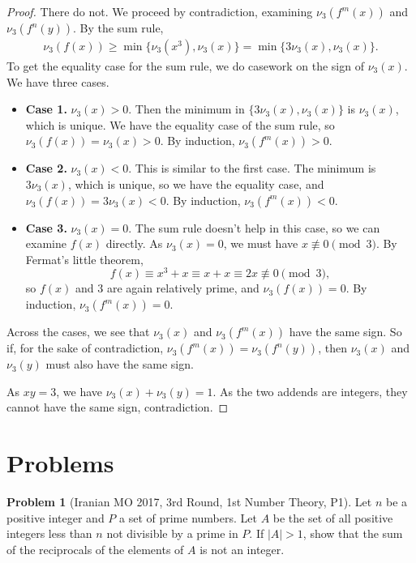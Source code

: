 \documentclass[11pt]{article}
\theoremstyle{definition}
\newtheorem{problem}{Problem}
\begin{document}
\begin{proof}
There do not. We proceed by contradiction, examining $\nu_3(f^m(x))$ and $\nu_3(f^n(y))$. By the sum rule,
\begin{align*}
  \nu_3(f(x))
  \ge \min\{ \nu_3(x^3), \nu_3(x) \}
  = \min\{ 3 \nu_3(x), \nu_3(x) \}.
\end{align*}
To get the equality case for the sum rule, we do casework on the sign of $\nu_3(x)$. We have three cases.

\begin{itemize}

\item \textbf{Case 1.} $\nu_3(x) > 0$. Then the minimum in $\{ 3\nu_3(x), \nu_3(x) \}$ is $\nu_3(x)$, which is unique. We have the equality case of the sum rule, so $\nu_3(f(x)) = \nu_3(x) > 0$. By induction, $\nu_3(f^m(x)) > 0$.

\item \textbf{Case 2.} $\nu_3(x) < 0$. This is similar to the first case. The minimum is $3\nu_3(x)$, which is unique, so we have the equality case, and $\nu_3(f(x)) = 3\nu_3(x) < 0$. By induction, $\nu_3(f^m(x)) < 0$.

\item \textbf{Case 3.} $\nu_3(x) = 0$. The sum rule doesn't help in this case, so we can examine $f(x)$ directly. As $\nu_3(x) = 0$, we must have $x \not\equiv 0 \pmod 3$. By Fermat's little theorem, \[
  f(x) \equiv x^3 + x \equiv x + x \equiv 2x \not\equiv 0 \pmod{3},
\]
so $f(x)$ and $3$ are again relatively prime, and $\nu_3(f(x)) = 0$. By induction, $\nu_3(f^m(x)) = 0$.

\end{itemize}

Across the cases, we see that $\nu_3(x)$ and $\nu_3(f^m(x))$ have the same sign. So if, for the sake of contradiction, $\nu_3(f^m(x)) = \nu_3(f^n(y))$, then $\nu_3(x)$ and $\nu_3(y)$ must also have the same sign.

As $xy = 3$, we have $\nu_3(x) + \nu_3(y) = 1$. As the two addends are integers, they cannot have the same sign, contradiction.
\end{proof}

\section{Problems}

\begin{problem}[Iranian MO 2017, 3rd Round, 1st Number Theory, P1]
Let $n$ be a positive integer and $P$ a set of prime numbers. Let $A$ be the set of all positive integers less than $n$ not divisible by a prime in $P$. If $|A| > 1$, show that the sum of the reciprocals of the elements of $A$ is not an integer.
\end{problem}
\end{document}
